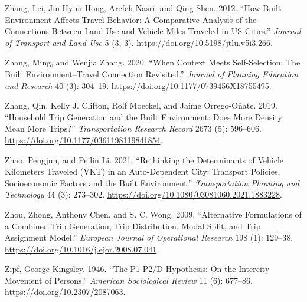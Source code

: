 \documentclass[
  12pt,
]{article}
\newlength{\cslhangindent}
\newlength{\cslentryspacingunit} %
\newenvironment{CSLReferences}[2] %
 {%
  \setlength{\parindent}{0pt}
  \ifodd #1
  \let\oldpar\par
  \def\par{\hangindent=\cslhangindent\oldpar}
  \fi
  \setlength{\parskip}{#2\cslentryspacingunit}
 }%
 {}
\begin{document}
\begin{CSLReferences}{1}{0}
\leavevmode{}%
Zhang, Lei, Jin Hyun Hong, Arefeh Nasri, and Qing Shen. 2012. {``How Built Environment Affects Travel Behavior: {A} Comparative Analysis of the Connections Between Land Use and Vehicle Miles Traveled in {US} Cities.''} \emph{Journal of Transport and Land Use} 5 (3, 3). \url{https://doi.org/10.5198/jtlu.v5i3.266}.

\leavevmode{}%
Zhang, Ming, and Wenjia Zhang. 2020. {``When {Context Meets Self-Selection}: {The Built Environment}--{Travel Connection Revisited}.''} \emph{Journal of Planning Education and Research} 40 (3): 304--19. \url{https://doi.org/10.1177/0739456X18755495}.

\leavevmode{}%
Zhang, Qin, Kelly J. Clifton, Rolf Moeckel, and Jaime Orrego-Oñate. 2019. {``Household {Trip Generation} and the {Built Environment}: {Does More Density Mean More Trips}?''} \emph{Transportation Research Record} 2673 (5): 596--606. \url{https://doi.org/10.1177/0361198119841854}.

\leavevmode{}%
Zhao, Pengjun, and Peilin Li. 2021. {``Rethinking the Determinants of Vehicle Kilometers Traveled ({VKT}) in an Auto-Dependent City: Transport Policies, Socioeconomic Factors and the Built Environment.''} \emph{Transportation Planning and Technology} 44 (3): 273--302. \url{https://doi.org/10.1080/03081060.2021.1883228}.

\leavevmode{}%
Zhou, Zhong, Anthony Chen, and S. C. Wong. 2009. {``Alternative Formulations of a Combined Trip Generation, Trip Distribution, Modal Split, and Trip Assignment Model.''} \emph{European Journal of Operational Research} 198 (1): 129--38. \url{https://doi.org/10.1016/j.ejor.2008.07.041}.

\leavevmode{}%
Zipf, George Kingsley. 1946. {``The {P1 P2}/{D Hypothesis}: {On} the {Intercity Movement} of {Persons}.''} \emph{American Sociological Review} 11 (6): 677--86. \url{https://doi.org/10.2307/2087063}.

\end{CSLReferences}
\end{document}
